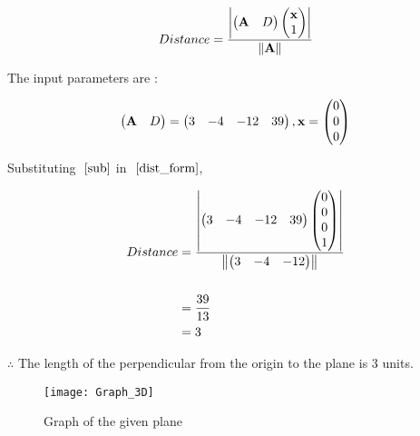 \documentclass[journal,12pt,twocolumn]{IEEEtran}
\begin{document}
	\begin{align}
		Distance = \frac{\left\vert\begin{pmatrix}\mathbf{A} & D\end{pmatrix} \begin{pmatrix}\mathbf{x} \\ 1\end{pmatrix}\right\vert}{\left\lVert\mathbf{A}\right\rVert}
			\label{dist_form}
	\end{align}
	
	
	The input parameters are :
	
	\begin{align}
		\begin{pmatrix}\mathbf{A} & D\end{pmatrix} = \begin{pmatrix}3 & -4 & -12 & 39\end{pmatrix},
		\mathbf{x} = \begin{pmatrix}0 \\ 0 \\ 0\end{pmatrix}
			                         \label{sub}
	\end{align}
	
	
	Substituting $~\eqref{sub}$ in $~\eqref{dist_form}$,
	
	\begin{align}
		Distance &= \frac{\left\vert\begin{pmatrix}3 & -4 & -12 & 39\end{pmatrix} \begin{pmatrix}0 \\ 0 \\ 0 \\ 1\end{pmatrix}\right\vert}{\left\lVert\begin{pmatrix}3 & -4 & -12\end{pmatrix}\right\rVert}  \\
				\nonumber\\
				&= \frac{39}{13} \\
				&= 3
	\end{align}
		
		
	$\therefore$ The length of the perpendicular from the origin to the plane  is \underline{$3$} units.


	\begin{figure}[h!]
		\centering
		\texttt{[image: Graph\_3D]}
		\caption{Graph of the given plane}
	\end{figure}
\end{document}
